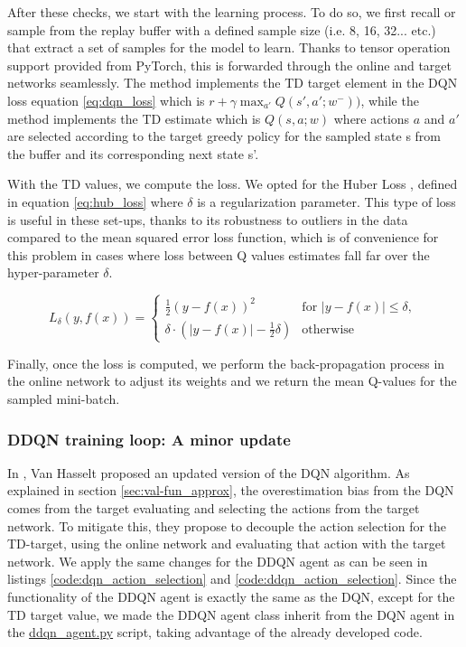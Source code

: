 After these checks, we start with the learning process. To do so, we first recall or sample from the replay buffer with a defined sample size (i.e. 8, 16, 32... etc.) that extract a set of samples for the model to learn. Thanks to tensor operation support provided from PyTorch, this is forwarded through the online and target networks seamlessly. The  method implements the TD target element in the DQN loss equation \ref{eq:dqn_loss} which is $r + \gamma \max_{a'} Q(s', a'; w^-))$, while the method  implements the TD estimate which is $Q(s, a; w)$ where actions $a$ and $a'$ are selected according to the target greedy policy for the sampled state s from the buffer and its corresponding next state s'.

With the TD values, we compute the loss. We opted for the Huber Loss \cite{9918637}, defined in equation \ref{eq:hub_loss} where $\delta$ is a regularization parameter. This type of loss is useful in these set-ups, thanks to its robustness to outliers in the data compared to the mean squared error loss function, which is of convenience for this problem in cases where loss between Q values estimates fall far over the hyper-parameter $\delta$.

\begin{equation}
	\label{eq:hub_loss}
	L_{\delta}(y, f(x)) = 
	\begin{cases} 
		\frac{1}{2}(y-f(x))^2 & \text{for $|y-f(x)| \leq \delta$, } \\
		\delta \cdot \left(|y-f(x)| - \frac{1}{2}\delta \right) & \text{otherwise}
	\end{cases}
\end{equation}

Finally, once the loss is computed, we perform the back-propagation process in the online network to adjust its weights and we return the mean Q-values for the sampled mini-batch.

\subsubsection{DDQN training loop: A minor update}
\label{sec:ddqn_training_loop}
In \cite{vanhasselt2015deep}, Van Hasselt  proposed an updated version of the DQN algorithm. As explained in section \ref{sec:val-fun_approx}, the overestimation bias from the DQN comes from the target evaluating and selecting the actions from the target network. To mitigate this, they propose to decouple the action selection for the TD-target, using the online network and evaluating that action with the target network. We apply the same changes for the DDQN agent as can be seen in listings \ref{code:dqn_action_selection} and \ref{code:ddqn_action_selection}. Since the functionality of the DDQN agent is exactly the same as the DQN, except for the TD target value, we made the DDQN agent class inherit from the DQN agent in the \href{https://github.com/Javimh18/DL_TFM/blob/main/src/agents/ddqn_agent.py}{ddqn\_agent.py} script, taking advantage of the already developed code.

